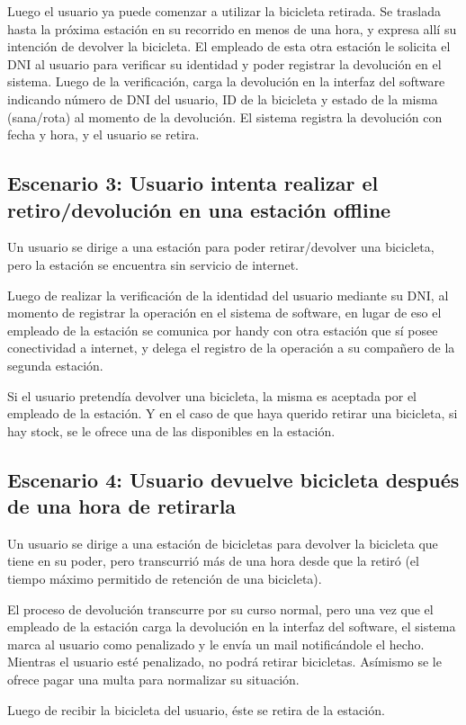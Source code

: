 \documentclass[a4paper, 10pt, twoside]{article}
\begin{document}
Luego el usuario ya puede comenzar a utilizar la bicicleta retirada. Se traslada hasta la próxima estación en su recorrido en menos de una hora, y expresa allí su intención de devolver la bicicleta. El empleado de esta otra estación le solicita el DNI al usuario para verificar su identidad y poder registrar la devolución en el sistema. Luego de la verificación, carga la devolución en la interfaz del software indicando número de DNI del usuario, ID de la bicicleta y estado de la misma (sana/rota) al momento de la devolución. El sistema registra la devolución con fecha y hora, y el usuario se retira.


\subsection{Escenario 3: Usuario intenta realizar el retiro/devolución en una estación offline}

Un usuario se dirige a una estación para poder retirar/devolver una bicicleta, pero la estación se encuentra sin servicio de internet.

Luego de realizar la verificación de la identidad del usuario mediante su DNI, al momento de registrar la operación en el sistema de software, en lugar de eso el empleado de la estación se comunica por handy con otra estación que sí posee conectividad a internet, y delega el registro de la operación a su compañero de la segunda estación.

Si el usuario pretendía devolver una bicicleta, la misma es aceptada por el empleado de la estación. Y en el caso de que haya querido retirar una bicicleta, si hay stock, se le ofrece una de las disponibles en la estación.


\subsection{Escenario 4: Usuario devuelve bicicleta después de una hora de retirarla}

Un usuario se dirige a una estación de bicicletas para devolver la bicicleta que tiene en su poder, pero transcurrió más de una hora desde que la retiró (el tiempo máximo permitido de retención de una bicicleta).

El proceso de devolución transcurre por su curso normal, pero una vez que el empleado de la estación carga la devolución en la interfaz del software, el sistema marca al usuario como penalizado y le envía un mail notificándole el hecho. Mientras el usuario esté penalizado, no podrá retirar bicicletas. Asímismo se le ofrece pagar una multa para normalizar su situación.

Luego de recibir la bicicleta del usuario, éste se retira de la estación.
\end{document}
